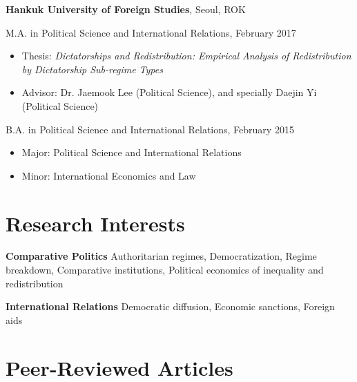 \documentclass[margin,line]{res}
\begin{document}
\begin{resume}
{\bf Hankuk University of Foreign Studies}, Seoul, ROK

\vspace*{-4mm}
M.A. in Political Science and International Relations, February 2017\\
\vspace*{-4mm}
\begin{itemize} \itemsep -1mm 
	\item[]  \hspace*{-6mm} Thesis: {\it Dictatorships and Redistribution: Empirical Analysis of Redistribution by Dictatorship Sub-regime Types}
	\item[]  \hspace*{-6mm} Advisor: Dr. Jaemook Lee (Political Science), and specially Daejin Yi (Political Science)
\end{itemize}
\vspace*{-3mm}
B.A. in Political Science and International Relations, February 2015\\
\vspace*{-4mm}
\begin{itemize} \itemsep -1mm
	\item[]  \hspace*{-6mm} Major: Political Science and International Relations
	\item[]  \hspace*{-6mm} Minor: International Economics and Law
\end{itemize}

\section{\sc Research Interests}
{\bf Comparative Politics} Authoritarian regimes, Democratization, Regime breakdown, Comparative institutions, Political economics of inequality and redistribution

\vspace{-.3cm}
{\bf International Relations} Democratic diffusion, Economic sanctions, Foreign aids

\section{\sc Peer-Reviewed Articles}


\end{resume}
\end{document}

